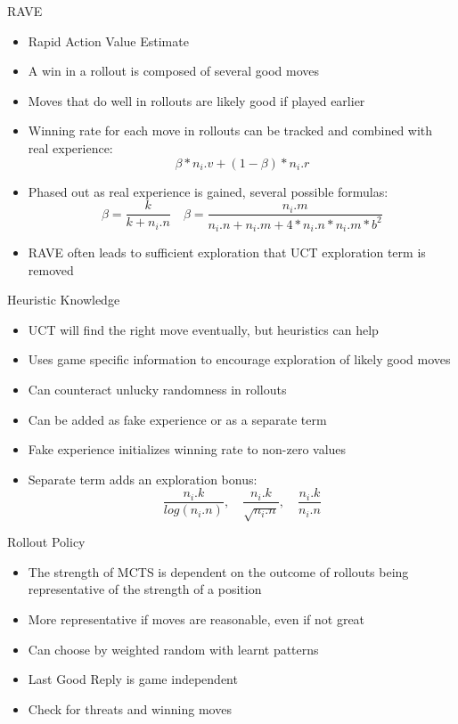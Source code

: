\documentclass{beamer} %
\begin{document}
\begin{frame}{RAVE}
\begin{itemize}
	\item Rapid Action Value Estimate
	\item A win in a rollout is composed of several good moves
	\item Moves that do well in rollouts are likely good if played earlier
	\item Winning rate for each move in rollouts can be tracked and combined with real experience: $$ \beta*n_i.v + (1-\beta)*n_i.r $$
	\item Phased out as real experience is gained, several possible formulas: $$ \beta = \frac{k}{k+n_i.n} \quad \beta = \frac{n_i.m}{n_i.n+n_i.m+4*n_i.n*n_i.m*b^2}$$
	\item RAVE often leads to sufficient exploration that UCT exploration term is removed
\end{itemize}
\end{frame}

\begin{frame}{Heuristic Knowledge}
\begin{itemize}
	\item UCT will find the right move eventually, but heuristics can help
	\item Uses game specific information to encourage exploration of likely good moves
	\item Can counteract unlucky randomness in rollouts
	\item Can be added as fake experience or as a separate term
	\item Fake experience initializes winning rate to non-zero values
	\item Separate term adds an exploration bonus: $$\frac{n_i.k}{log(n_i.n)}, \quad \frac{n_i.k}{\sqrt{n_i.n}}, \quad \frac{n_i.k}{n_i.n}$$
\end{itemize}
\end{frame}


\begin{frame}{Rollout Policy}
\begin{itemize}
	\item The strength of MCTS is dependent on the outcome of rollouts being representative of the strength of a position
	\item More representative if moves are reasonable, even if not great
	\item Can choose by weighted random with learnt patterns
	\item Last Good Reply is game independent
	\item Check for threats and winning moves
\end{itemize}
\end{frame}
\end{document}
